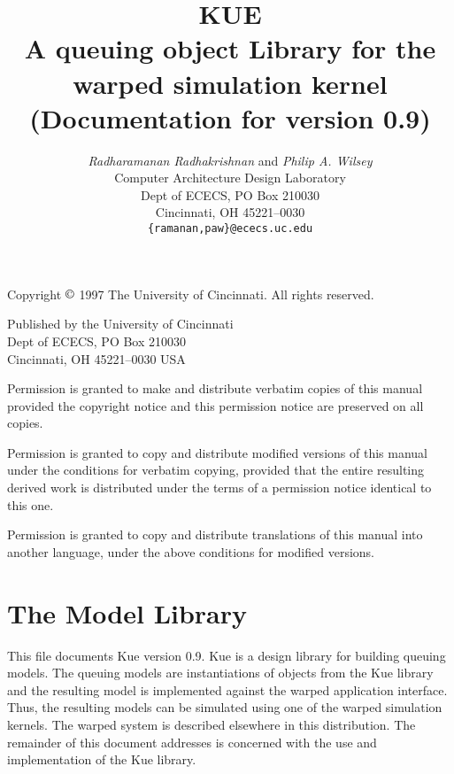 \documentclass[11pt]{report}
\newcommand{\version}{0.9}
\begin{document}
\title{
\textbf{KUE}\\
A queuing object Library for the {\sc warped} simulation kernel\\
(Documentation for version \version)}

\author{
\emph{Radharamanan Radhakrishnan} and \emph{Philip A.  Wilsey} \\
Computer Architecture Design Laboratory \\
Dept of ECECS, PO Box 210030 \\
Cincinnati, OH  45221--0030 \\
\texttt{\{ramanan,paw\}@ececs.uc.edu}
}

\date{}

\maketitle

\vspace*{6in}

\noindent
Copyright $\copyright$ 1997 The University of Cincinnati.  All
rights reserved.  

\bigskip

\noindent
Published by the University of Cincinnati \\
Dept of ECECS, PO Box 210030 \\
Cincinnati, OH  45221--0030 USA 

\bigskip

\noindent
Permission is granted to make and distribute verbatim copies of
this manual provided the copyright notice and this permission notice
are preserved on all copies.

\medskip
\noindent
Permission is granted to copy and distribute modified versions of this
manual under the conditions for verbatim copying, provided that the entire
resulting derived work is distributed under the terms of a permission
notice identical to this one.

\medskip
\noindent
Permission is granted to copy and distribute translations of this manual
into another language, under the above conditions for modified versions.

\newpage

\tableofcontents

\chapter{The Model Library}

This file documents Kue version \version.  Kue is a design library for
building queuing models.  The queuing models are instantiations of
objects from the Kue library and the resulting model is implemented
against the {\sc warped} application interface.  Thus, the resulting
models can be simulated using one of the {\sc warped} simulation
kernels.  The {\sc warped} system is described elsewhere in this
distribution.  The remainder of this document addresses is concerned
with the use and implementation of the Kue library.
\end{document}
